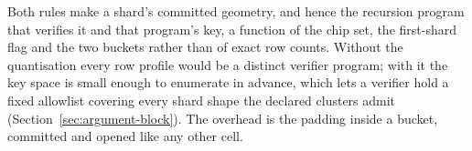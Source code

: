 Both rules make a shard's committed geometry, and hence the recursion program that verifies it and that program's key, a function of the chip set, the first-shard flag and the two buckets rather than of exact row counts. Without the quantisation every row profile would be a distinct verifier program; with it the key space is small enough to enumerate in advance, which lets a verifier hold a fixed allowlist covering every shard shape the declared clusters admit (Section~\ref{sec:argument-block}). The overhead is the padding inside a bucket, committed and opened like any other cell.
